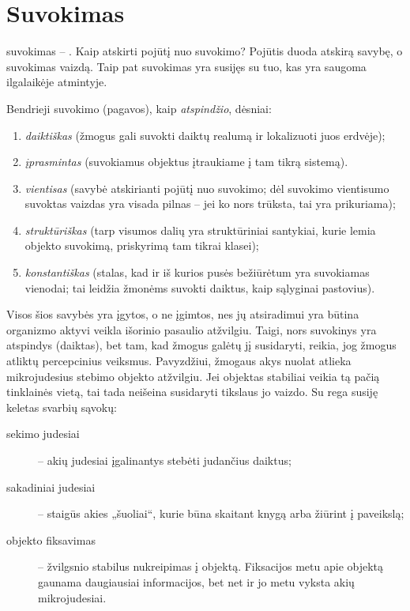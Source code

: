 \section{Suvokimas}

\label{tema:suvokimas}

\Gls{suvokimas} – . Kaip atskirti pojūtį nuo 
suvokimo? Pojūtis duoda atskirą savybę, o suvokimas vaizdą. Taip pat 
suvokimas yra susijęs su tuo, kas yra saugoma ilgalaikėje atmintyje.

Bendrieji suvokimo (pagavos), kaip \emph{atspindžio}, dėsniai:
\begin{enumerate}
  \item \emph{daiktiškas} (žmogus gali suvokti daiktų realumą ir 
    lokalizuoti juos erdvėje);
  \item \emph{įprasmintas} (suvokiamus objektus įtraukiame į tam tikrą 
    sistemą).
  \item \emph{vientisas} (savybė atskirianti pojūtį nuo suvokimo; dėl
    suvokimo vientisumo suvoktas vaizdas yra visada pilnas – jei ko nors
    trūksta, tai yra prikuriama);
  \item \emph{struktūriškas} (tarp visumos dalių yra struktūriniai 
    santykiai, kurie lemia objekto suvokimą, priskyrimą tam tikrai klasei);
  \item \emph{konstantiškas} (stalas, kad ir iš kurios pusės bežiūrėtum
    yra suvokiamas vienodai; tai leidžia žmonėms suvokti daiktus, kaip 
    sąlyginai pastovius).
\end{enumerate}
Visos šios savybės yra įgytos, o ne įgimtos, nes jų atsiradimui yra
būtina organizmo aktyvi veikla išorinio pasaulio atžvilgiu. Taigi, nors
suvokinys yra atspindys (daiktas), bet tam, kad žmogus galėtų jį
susidaryti, reikia, jog žmogus atliktų percepcinius veiksmus. Pavyzdžiui,
žmogaus akys nuolat atlieka mikrojudesius stebimo objekto atžvilgiu.
Jei objektas stabiliai veikia tą pačią tinklainės vietą, tai tada 
neišeina susidaryti tikslaus jo vaizdo. Su rega susiję keletas svarbių 
sąvokų:
\begin{description}
  \item[sekimo judesiai] – akių judesiai įgalinantys stebėti judančius
    daiktus;
  \item[sakadiniai judesiai] – staigūs akies „šuoliai“, kurie būna skaitant
    knygą arba žiūrint į paveikslą;
  \item[objekto fiksavimas] – žvilgsnio stabilus nukreipimas į objektą.
    Fiksacijos metu apie objektą gaunama daugiausiai informacijos, bet
    net ir jo metu vyksta akių mikrojudesiai.
\end{description}

